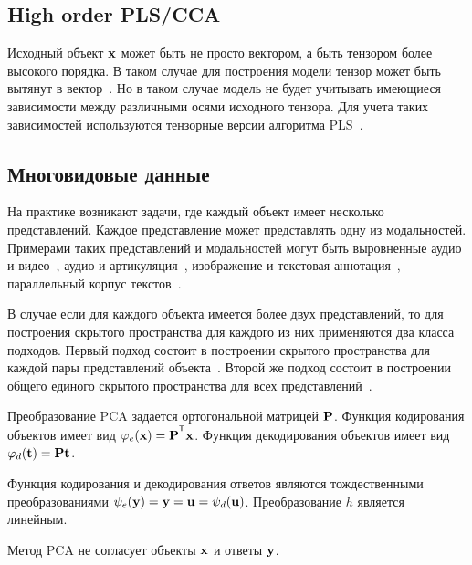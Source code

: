 \subsection{High order PLS/CCA}

Исходный объект $\mathbf{x}$ может быть не просто вектором, а быть тензором более высокого порядка. 
В таком случае для построения модели тензор может быть вытянут в вектор~\cite{cichocki2009nonnegative}. 
Но в таком случае модель не будет учитывать имеющиеся зависимости между различными осями исходного тензора.
Для учета таких зависимостей используются тензорные версии алгоритма PLS~\cite{zhao2012higher,eliseyev2013recursive,eliseyev2016penalized}.

\subsection{Многовидовые данные}

На практике возникают задачи, где каждый объект имеет несколько представлений. 
Каждое представление может представлять одну из модальностей. 
Примерами таких представлений и модальностей могут быть выровненные аудио и видео~\cite{kidron2005pixels,chaudhuri2009multi}, аудио и артикуляция~\cite{arora2012kernel}, изображение и текстовая аннотация~\cite{hardoon2004canonical,socher2010connecting,hodosh2013framing}, параллельный корпус текстов~\cite{vinokourov2003inferring,haghighi2008learning,ap2014autoencoder,faruqui2014improving}.

В случае если для каждого объекта имеется более двух представлений, то для построения скрытого пространства для каждого из них применяются два класса подходов. 
Первый подход состоит в построении скрытого пространства для каждой пары представлений объекта~\cite{masci2013multimodal,rajendran2015bridge}. 
Второй же подход состоит в построении общего единого скрытого пространства для всех представлений~\cite{kumar2011co,sharma2012generalized}.

\hrulefill

Преобразование PCA задается ортогональной матрицей $\mathbf{P}$. Функция кодирования объектов имеет вид $\varphi_e(\bx) = \bP^{\T}\bx$. Функция декодирования объектов имеет вид $\varphi_d(\mathbf{t}) = \mathbf{P}\mathbf{t}$. 

Функция кодирования и декодирования ответов являются тождественными преобразованиями $\psi_e(\mathbf{y}) =  \mathbf{y} = \mathbf{u} = \psi_d(\mathbf{u})$. Преобразование $h$ является линейным.

Метод PCA не согласует объекты $\mathbf{x}$ и ответы $\mathbf{y}$.


